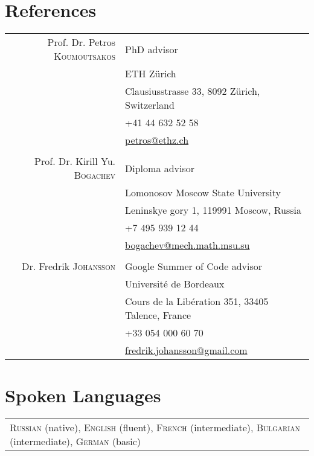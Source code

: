 \documentclass[a4paper,10pt]{article}
\begin{document}
\section{References}
\begin{tabular}{rl}
    Prof. Dr. Petros \textsc{Koumoutsakos} & PhD advisor \\
    & ETH Z\"urich \\
    & Clausiusstrasse 33, 8092 Z\"urich, Switzerland \\
    & +41 44 632 52 58 \\
    & \href{mailto:petros@ethz.ch}{petros@ethz.ch} \\
    & \\
    Prof. Dr. Kirill Yu. \textsc{Bogachev} & Diploma advisor \\
    & Lomonosov Moscow State University \\
    & Leninskye gory 1, 119991 Moscow, Russia \\
    & +7 495 939 12 44 \\
    & \href{mailto:bogachev@mech.math.msu.su}{bogachev@mech.math.msu.su} \\
    & \\
    Dr. Fredrik \textsc{Johansson} & Google Summer of Code advisor \\
    & Universit\'e de Bordeaux \\
    & Cours de la Lib\'eration 351, 33405 Talence, France \\
    & +33 054 000 60 70 \\
    & \href{mailto:fredrik.johansson@gmail.com}{fredrik.johansson@gmail.com} \\
\end{tabular}

\section{Spoken Languages}
\begin{tabular}{l}
    \textsc{Russian} (native), \textsc{English} (fluent), \textsc{French} (intermediate), \textsc{Bulgarian} (intermediate), \textsc{German} (basic)
\end{tabular}
\end{document}
